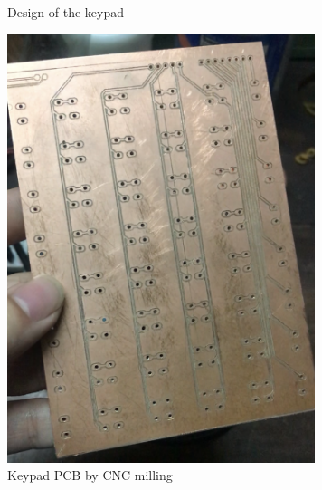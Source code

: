 \documentclass[a4paper, twoside]{report}
\begin{document}
 \begin{figure}[H]
    \centering
    \qquad
    \caption{Design of the keypad}
\end{figure}

 \begin{figure}[H]
    \centering
    \includegraphics[width=9cm]{PCB/pcb_keypad.png}
    \caption{Keypad PCB by CNC milling}
\end{figure}
\end{document}
